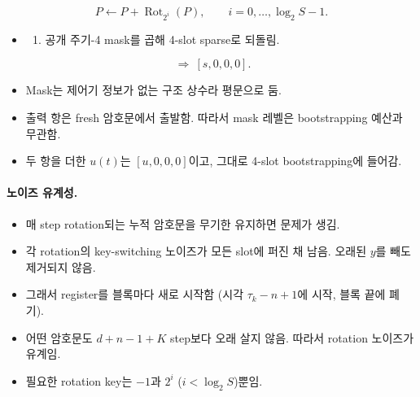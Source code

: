 \documentclass[11pt,a4paper]{article}
\newcommand{\Rot}{\operatorname{Rot}}
\begin{document}
\begin{equation}
P\leftarrow P+\Rot_{2^i}(P),\qquad i=0,\dots,\log_2S-1 .
\end{equation}
\begin{itemize}
\item[]
  \begin{enumerate}[start=3]
  \item 공개 주기-4 mask를 곱해 4-slot sparse로 되돌림.
  \end{enumerate}
\end{itemize}
\begin{equation}
[1,0,0,0,\ 1,0,0,0,\ \dots]\ \Rightarrow\ [s,0,0,0].
\end{equation}
\begin{itemize}
\item Mask는 제어기 정보가 없는 구조 상수라 평문으로 둠.
\item 출력 항은 fresh 암호문에서 출발함. 따라서 mask 레벨은 bootstrapping 예산과 무관함.
\item 두 항을 더한 $u(t)$는 $[u,0,0,0]$이고, 그대로 4-slot bootstrapping에 들어감.
\end{itemize}

\paragraph{노이즈 유계성.}
\begin{itemize}
\item 매 step rotation되는 누적 암호문을 무기한 유지하면 문제가 생김.
\item 각 rotation의 key-switching 노이즈가 모든 slot에 퍼진 채 남음. 오래된 $y$를 빼도 제거되지 않음.
\item 그래서 register를 블록마다 새로 시작함 (시각 $\tau_k-n+1$에 시작, 블록 끝에 폐기).
\item 어떤 암호문도 $d+n-1+K$ step보다 오래 살지 않음. 따라서 rotation 노이즈가 유계임.
\item 필요한 rotation key는 $-1$과 $2^i$ ($i<\log_2S$)뿐임.
\end{itemize}
\end{document}
